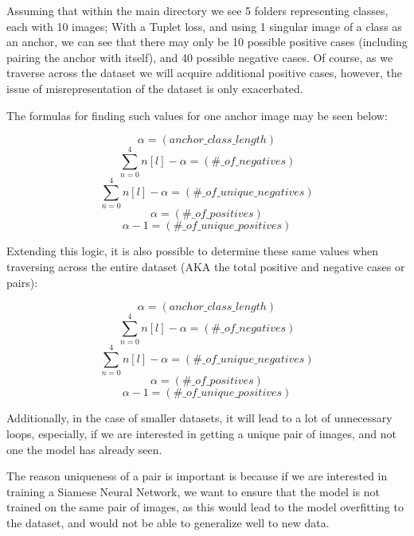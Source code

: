 \documentclass[
	letterpaper, %
	10pt, %
	unnumberedsections, %
	twoside, %
]{LTJournalArticle}
\begin{document}
Assuming that within the main directory we see 5 folders representing classes, each with 10 images; With a Tuplet loss, and using 1 singular image of a class as an anchor, we can see that there may only be 10 possible positive cases (including pairing the anchor with itself), and 40 possible negative cases. Of course, as we traverse across the dataset we will acquire additional positive cases, however, the issue of misrepresentation of the dataset is only exacerbated.  

The formulas for finding such values for one anchor image may be seen below:

\[ \alpha = (anchor\_class\_length) \]
\[ \sum_{n = 0}^4 n[l] - \alpha = (\#\_of\_negatives) \]
\[ \sum_{n = 0}^4 n[l] - \alpha = (\#\_of\_unique\_negatives) \]
\[ \alpha = (\#\_of\_positives) \]
\[ \alpha-1 = (\#\_of\_unique\_positives) \]

Extending this logic, it is also possible to determine these same values when traversing across the entire dataset (AKA the total positive and negative cases or pairs):

\[ \alpha = (anchor\_class\_length) \]
\[ \sum_{n = 0}^4 n[l] - \alpha = (\#\_of\_negatives) \]
\[ \sum_{n = 0}^4 n[l] - \alpha = (\#\_of\_unique\_negatives) \]
\[ \alpha = (\#\_of\_positives) \]
\[ \alpha-1 = (\#\_of\_unique\_positives) \]



Additionally, in the case of smaller datasets, it will lead to a lot of unnecessary loops, especially, if we are interested in getting a unique pair of images, and not one the model has already seen.


The reason uniqueness of a pair is important is because if we are interested in training a Siamese Neural Network, we want to ensure that the model is not trained on the same pair of images, as this would lead to the model overfitting to the dataset, and would not be able to generalize well to new data.
\end{document}
